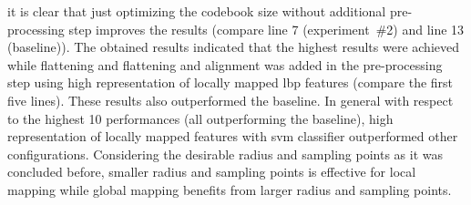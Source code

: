 it is clear that just optimizing the codebook size without additional pre-processing step improves the results (compare line 7 (experiment~\#2) and line 13 (baseline)).
The obtained results indicated that the highest results were achieved while flattening and flattening and alignment was added in the pre-processing step using high representation of locally mapped \ac{lbp} features (compare the first five lines).
These results also outperformed the baseline.
In general with respect to the highest 10 performances (all outperforming the baseline), high representation of locally mapped features with \ac{svm} classifier outperformed other configurations.
Considering the desirable radius and sampling points as it was concluded before, smaller radius and sampling points is effective for local mapping while global mapping benefits from larger radius and sampling points.

